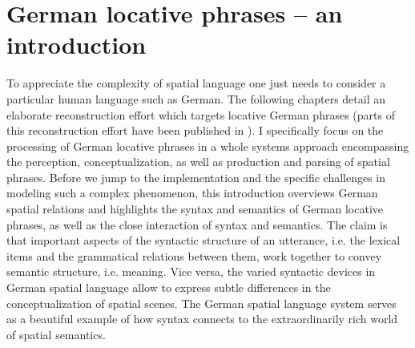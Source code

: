 
%

\chapter{German locative phrases -- an introduction}
\label{s:german-spatial-language-introduction}

To appreciate the complexity of spatial language one just needs
to consider a particular human language such as German.
The following chapters detail an elaborate reconstruction 
effort which targets locative German phrases (parts of this reconstruction
effort have been published in \citealp{spranger2011german}). 
I specifically focus on the processing of German locative phrases 
in a whole systems approach encompassing the perception, conceptualization,
as well as production and parsing of spatial phrases.
Before we jump to the implementation and the specific
challenges in modeling such a complex phenomenon, this introduction
overviews German spatial relations and highlights the syntax and 
semantics of German locative phrases, as well as the
close interaction of syntax and semantics. 
The claim is that important aspects of the syntactic structure of an utterance, i.e. 
the lexical items and the grammatical relations between them, work together to convey 
semantic structure, i.e. meaning. Vice versa, the varied syntactic 
devices in German spatial language allow to express subtle differences
in the conceptualization of spatial scenes. The German spatial language system serves 
as a beautiful example of how syntax connects to the extraordinarily rich world of 
spatial semantics. %


